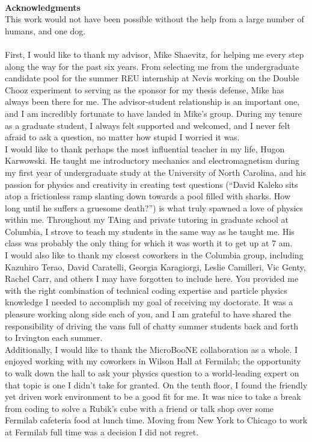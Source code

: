 ~\\[1in] %
\textbf{\Huge Acknowledgments}\\

\noindent 
This work would not have been possible without the help from a large number of humans, and one dog.\\\\

First, I would like to thank my advisor, Mike Shaevitz, for helping me every step along the way for the past six years. From selecting me from the undergraduate candidate pool for the summer REU internship at Nevis working on the Double Chooz experiment to serving as the sponsor for my thesis defense, Mike has always been there for me. The advisor-student relationship is an important one, and I am incredibly fortunate to have landed in Mike's group. During my tenure as a graduate student, I always felt supported and welcomed, and I never felt afraid to ask a question, no matter how stupid I worried it was.\\

I would like to thank perhaps the most influential teacher in my life, Hugon Karwowski. He taught me introductory mechanics and electromagnetism during my first year of undergraduate study at the University of North Carolina, and his passion for physics and creativity in creating test questions (``David Kaleko sits atop a frictionless ramp slanting down towards a pool filled with sharks. How long until he suffers a gruesome death?'') is what truly spawned a love of physics within me. Throughout my TAing and private tutoring in graduate school at Columbia, I strove to teach my students in the same way as he taught me. His class was probably the only thing for which it was worth it to get up at 7 am.\\

I would also like to thank my closest coworkers in the Columbia group, including Kazuhiro Terao, David Caratelli, Georgia Karagiorgi, Leslie Camilleri, Vic Genty, Rachel Carr, and others I may have forgotten to include here. You provided me with the right combination of technical coding expertise and particle physics knowledge I needed to accomplish my goal of receiving my doctorate. It was a pleasure working along side each of you, and I am grateful to have shared the responsibility of driving the vans full of chatty summer students back and forth to Irvington each summer.\\

Additionally, I would like to thank the MicroBooNE collaboration as a whole. I enjoyed working with my coworkers in Wilson Hall at Fermilab; the opportunity to walk down the hall to ask your physics question to a world-leading expert on that topic is one I didn't take for granted. On the tenth floor, I found the friendly yet driven work environment to be a good fit for me. It was nice to take a break from coding to solve a Rubik's cube with a friend or talk shop over some Fermilab cafeteria food at lunch time. Moving from New York to Chicago to work at Fermilab full time was a decision I did not regret.\\

